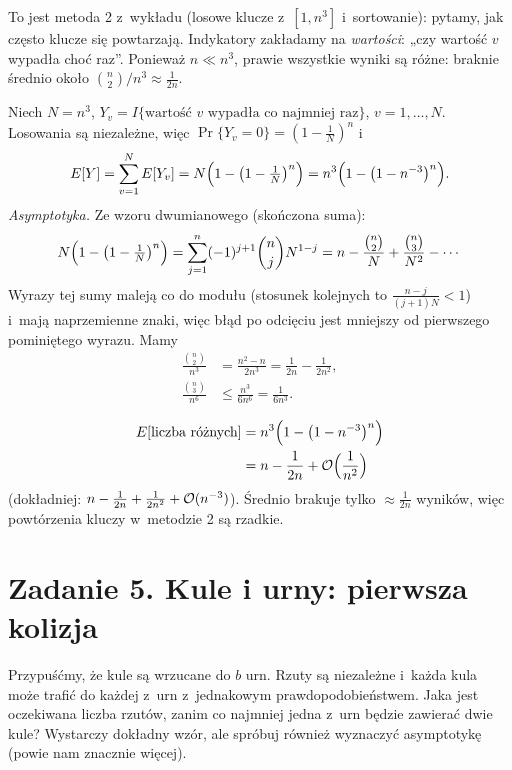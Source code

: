 \documentclass[11pt]{article}
\begin{document}
\begin{intuicja}
To jest metoda 2 z~wykładu (losowe klucze z~$[1,n^3]$ i~sortowanie): pytamy,
jak często klucze się powtarzają. Indykatory zakładamy na \emph{wartości}:
„czy wartość $v$ wypadła choć raz”. Ponieważ $n\ll n^3$, prawie wszystkie
wyniki są różne: braknie średnio około $\binom n2/n^3\approx\frac{1}{2n}$.
\end{intuicja}
\formalnie
Niech $N=n^3$, $Y_v=I\{\text{wartość $v$ wypadła co najmniej raz}\}$,
$v=1,\dots,N$. Losowania są niezależne, więc
$\Pr\{Y_v=0\}=(1-\frac1N)^n$ i
\[
E[Y]=\sum_{v=1}^NE[Y_v]=N\Bigl(1-\bigl(1-\tfrac1N\bigr)^n\Bigr)=n^3\Bigl(1-\bigl(1-n^{-3}\bigr)^n\Bigr).
\]
\emph{Asymptotyka.} Ze wzoru dwumianowego (skończona suma):
\[
N\Bigl(1-\bigl(1-\tfrac1N\bigr)^n\Bigr)=\sum_{j=1}^{n}(-1)^{j+1}\binom nj N^{1-j}
= n-\frac{\binom n2}{N}+\frac{\binom n3}{N^2}-\cdots
\]
Wyrazy tej sumy maleją co do modułu (stosunek kolejnych to
$\frac{n-j}{(j+1)N}<1$) i~mają naprzemienne znaki, więc błąd po
odcięciu jest mniejszy od pierwszego pominiętego wyrazu. Mamy
\begin{align*}
\frac{\binom n2}{n^3}&=\frac{n^2-n}{2n^3}=\frac1{2n}-\frac{1}{2n^2},\\
\frac{\binom n3}{n^6}&\le\frac{n^3}{6n^6}=\frac{1}{6n^3}.
\end{align*}
\begin{odpowiedz}
\vspace{-1ex}
\begin{align*}
E[\text{liczba różnych}]&=n^3\Bigl(1-\bigl(1-n^{-3}\bigr)^n\Bigr)\\
&=n-\frac1{2n}+\mathcal{O}\Bigl(\frac1{n^2}\Bigr)
\end{align*}
(dokładniej: $n-\frac1{2n}+\frac1{2n^2}+\mathcal{O}(n^{-3})$). Średnio brakuje tylko
$\approx\frac{1}{2n}$ wyników, więc powtórzenia kluczy w~metodzie 2 są rzadkie.
\end{odpowiedz}

\section{Zadanie 5. Kule i urny: pierwsza kolizja}
\begin{tresc}
Przypuśćmy, że kule są wrzucane do $b$ urn. Rzuty są niezależne i~każda kula
może trafić do każdej z~urn z~jednakowym prawdopodobieństwem. Jaka jest
oczekiwana liczba rzutów, zanim co najmniej jedna z~urn będzie zawierać dwie
kule? Wystarczy dokładny wzór, ale spróbuj również wyznaczyć asymptotykę
(powie nam znacznie więcej).
\end{tresc}
\end{document}
